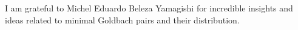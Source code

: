 ﻿I am grateful to Michel Eduardo Beleza Yamagishi for incredible insights and ideas related to minimal Goldbach pairs
and their distribution.
